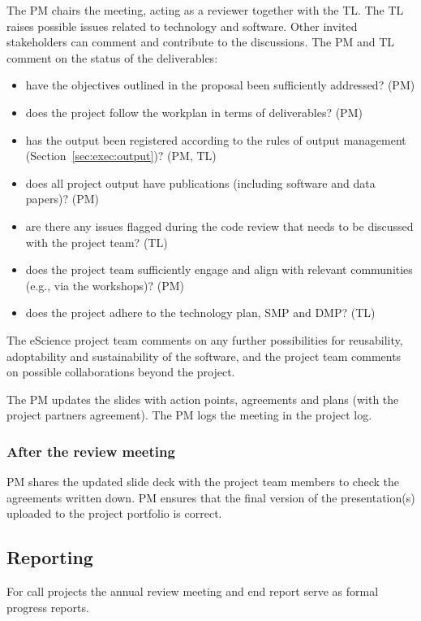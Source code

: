 The PM chairs the meeting, acting as a reviewer together with the TL. The TL raises possible issues related to
technology and software. Other invited stakeholders can comment and contribute to the discussions. The PM and TL
comment on the status of the deliverables:

\begin{itemize}
\item have the objectives outlined in the proposal been sufficiently addressed? (PM)
\item does the project follow the workplan in terms of deliverables? (PM)
\item has the output been registered according to the rules of output management (Section~\ref{sec:exec:output})? (PM, TL)
\item does all project output have publications (including software and data papers)? (PM)
\item are there any issues flagged during the code review that needs to be discussed with the project team? (TL)
\item does the project team sufficiently engage and align with relevant communities (e.g., via the workshops)? (PM)
\item does the project adhere to the technology plan, SMP and DMP? (TL)
\end{itemize}

The eScience project team comments on any further possibilities for reusability, adoptability and sustainability of the
software, and the project team comments on possible collaborations beyond the project.

The PM updates the slides with action points, agreements and plans (with the project partners agreement). The PM logs
the meeting in the project log.

\subsubsection{After the review meeting}
PM shares the updated slide deck with the project team members to check the agreements written down. PM ensures that the
final version of the presentation(s) uploaded to the project portfolio is correct.

\subsection{Reporting}
For call projects the annual review meeting and end report serve as formal progress reports.

